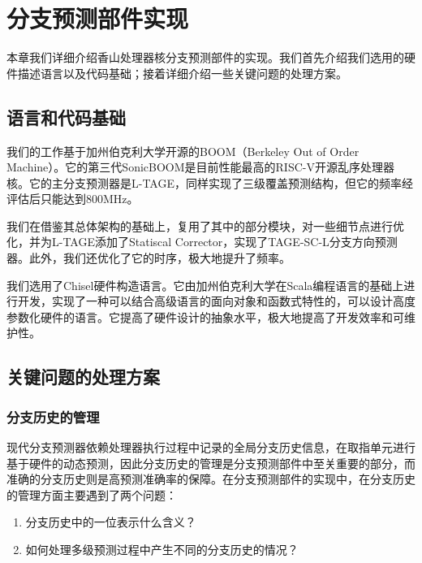 \chapter{分支预测部件实现}\label{chap:impl}
本章我们详细介绍香山处理器核分支预测部件的实现。我们首先介绍我们选用的硬件描述语言以及代码基础；接着详细介绍一些关键问题的处理方案。

\section{语言和代码基础}
我们的工作基于加州伯克利大学开源的BOOM（Berkeley Out of Order Machine）\cite{asanovic2015berkeley}。它的第三代SonicBOOM\cite{zhao2020sonicboom}是目前性能最高的RISC-V开源乱序处理器核。它的主分支预测器是L-TAGE\cite{seznec2011new}，同样实现了三级覆盖预测结构，但它的频率经评估后只能达到800MHz。

我们在借鉴其总体架构的基础上，复用了其中的部分模块，对一些细节点进行优化，并为L-TAGE\cite{seznec2011new}添加了Statiscal Corrector，实现了TAGE-SC-L\cite{seznec2014tage}分支方向预测器。此外，我们还优化了它的时序，极大地提升了频率。

我们选用了Chisel硬件构造语言\cite{bachrach2012chisel}。它由加州伯克利大学在Scala编程语言的基础上进行开发，实现了一种可以结合高级语言的面向对象和函数式特性的，可以设计高度参数化硬件的语言。它提高了硬件设计的抽象水平，极大地提高了开发效率和可维护性。

\section{关键问题的处理方案}
\subsection{分支历史的管理}
现代分支预测器依赖处理器执行过程中记录的全局分支历史信息，在取指单元进行基于硬件的动态预测，因此分支历史的管理是分支预测部件中至关重要的部分，而准确的分支历史则是高预测准确率的保障。在分支预测部件的实现中，在分支历史的管理方面主要遇到了两个问题：
\begin{enumerate}
    \item 分支历史中的一位表示什么含义？\label{his:q1}
    \item 如何处理多级预测过程中产生不同的分支历史的情况？\label{his:q2}
\end{enumerate}

